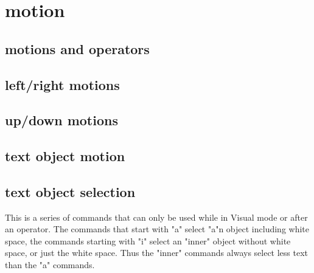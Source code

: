 \section{\hrulefill motion\hrulefill}

\subsection{motions and operators}

\subsection{left/right motions}

\subsection{up/down motions}

\subsection{text object motion}

\subsection{text object selection}
This is a series of commands that can only be used while in Visual mode or
after an operator.  The commands that start with "a" select "a"n object
including white space, the commands starting with "i" select an "inner" object
without white space, or just the white space.  Thus the "inner" commands
always select less text than the "a" commands. \\

